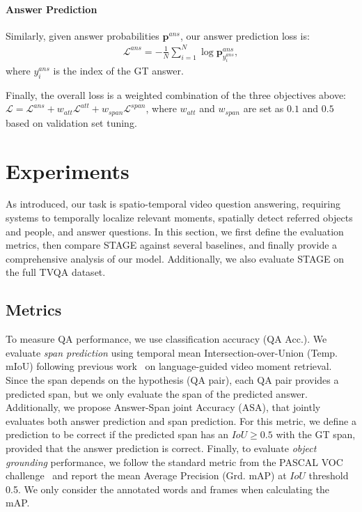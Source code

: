 \documentclass[11pt,a4paper]{article}
\begin{document}
\paragraph{Answer Prediction} 
Similarly, given answer probabilities $\mathbf{p}^{ans}$, our answer prediction loss is:
\begin{align*}
    \mathcal{L}^\mathit{ans} = - \frac{1}{N} \sum_{i=1}^{N} \log \mathbf{p}^\mathit{ans}_{y_i^\mathit{ans}},
\end{align*}
\noindent where $y_i^\mathit{ans}$ is the index of the GT answer. 

Finally, the overall loss is a weighted combination of the three objectives above: $\mathcal{L} = \mathcal{L}^\mathit{ans} + w_{att} \mathcal{L}^{att} + w_\mathit{span} \mathcal{L}^\mathit{span}$, where $w_{att}$ and $w_\mathit{span}$ are set as $0.1$ and $0.5$ based on validation set tuning.


\section{Experiments}\label{exp}
As introduced, our task is spatio-temporal video question answering, requiring systems to temporally localize relevant moments, spatially detect referred objects and people, and answer questions. 
In this section, we first define the evaluation metrics, then compare STAGE against several baselines, and finally provide a comprehensive analysis of our model. 
Additionally, we also evaluate STAGE on the full TVQA dataset.


\subsection{Metrics}

To measure QA performance, we use classification accuracy (QA Acc.). 
We evaluate \textit{span prediction} using temporal mean Intersection-over-Union (Temp. mIoU) following previous work~\cite{Hendricks2017LocalizingMI} on language-guided video moment retrieval. 
Since the span depends on the hypothesis (QA pair), each QA pair provides a predicted span, but we only evaluate the span of the predicted answer.
Additionally, we propose Answer-Span joint Accuracy (ASA), that jointly evaluates both answer prediction and span prediction. 
For this metric, we define a prediction to be correct if the predicted span has an $\mathit{IoU} \geq 0.5$ with the  GT span, provided that the answer prediction is correct. 
Finally, to evaluate \textit{object grounding} performance, we follow the standard metric from the PASCAL VOC challenge~\cite{everingham2015pascal} and report the mean Average Precision (Grd. mAP) at $\mathit{IoU}$ threshold 0.5. We only consider the annotated words and frames when calculating the mAP.
\end{document}
